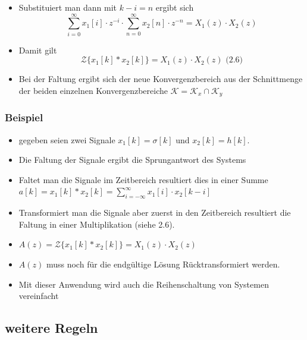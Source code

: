 \documentclass[11pt]{article}
\providecommand{\tightlist}{%
      \setlength{\itemsep}{0pt}\setlength{\parskip}{0pt}}
\begin{document}
    \begin{itemize}
\tightlist
\item
  Substituiert man dann mit \(k-i = n\) ergibt sich
  \[\sum_{i=0}^\infty x_1[i] \cdot z^{-i} \cdot \sum_{n=0}^\infty x_2[n] \cdot z^{-n} = X_1(z) \cdot X_2(z)\]
\end{itemize}

    \begin{itemize}
\tightlist
\item
  Damit gilt
  \[\mathcal{Z} \{x_1[k] * x_2[k]\} = X_1(z) \cdot X_2(z)\textrm{  (2.6)}\]
\end{itemize}

    \begin{itemize}
\tightlist
\item
  Bei der Faltung ergibt sich der neue Konvergenzbereich aus der
  Schnittmenge der beiden einzelnen Konvergenzbereiche
  \(\mathcal{K} = \mathcal{K}_x \cap \mathcal{K}_y\)
\end{itemize}

    \subsubsection{Beispiel}\label{beispiel}

\begin{itemize}
\item
  gegeben seien zwei Signale \(x_1[k] = \sigma[k]\) und
  \(x_2[k] = h[k]\).
\item
  Die Faltung der Signale ergibt die Sprungantwort des Systems
\item
  Faltet man die Signale im Zeitbereich resultiert dies in einer Summe
  \(a[k] = x_1[k] * x_2[k] = \sum_{i=-\infty}^{\infty} x_1[i] \cdot x_2[k-i]\)
\item
  Transformiert man die Signale aber zuerst in den Zeitbereich
  resultiert die Faltung in einer Multiplikation (siehe 2.6).
\item
  \(A(z) = \mathcal{Z} \{x_1[k] * x_2[k]\} = X_1(z) \cdot X_2(z)\)
\item
  \(A(z)\) muss noch für die endgültige Lösung Rücktransformiert werden.
\item
  Mit dieser Anwendung wird auch die Reihenschaltung von Systemen
  vereinfacht
\end{itemize}

    \subsection{weitere Regeln}\label{weitere-regeln}
\end{document}
